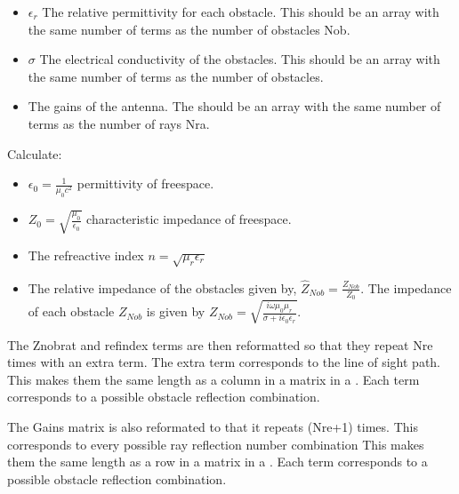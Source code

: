 \documentclass[letterpaper,10pt,english]{sphinxmanual}
\begin{document}
\begin{fulllineitems}
\begin{itemize}
\item {} 
     \sphinxhyphen{} \(\epsilon_r\) The relative permittivity for each obstacle.   This should be an array with the same number of terms as the number   of obstacles Nob.

\item {} 
     \sphinxhyphen{} \(\sigma\) The electrical conductivity of the obstacles.   This should be an array with the same number of terms as the number   of obstacles.

\item {} 
        \sphinxhyphen{} The gains of the antenna. The should be an array with   the same number of terms as the number of rays Nra.

\end{itemize}

Calculate:
\begin{itemize}
\item {} 
   \sphinxhyphen{} \(\epsilon_0=\frac{1}{\mu_0 c^2}\)  permittivity of   freespace.

\item {} 
     \sphinxhyphen{} \(Z_0=\sqrt{\frac{\mu_0}{\epsilon_0}}\) characteristic   impedance of freespace.

\item {} 
 \sphinxhyphen{} The refreactive index   \(n=\sqrt{\mu_r\epsilon_r}\)

\item {} 
\sphinxhyphen{} The relative impedance of the obstacles given by,
\(\hat{Z}_{Nob}=\frac{Z_{Nob}}{Z_0}\). The impedance of each     obstacle \(Z_{Nob}\) is given by     \(Z_{Nob}=\sqrt{\frac{i\omega\mu_0\mu_r}{\sigma+i\epsilon_0\epsilon_r}}\).

\end{itemize}

The Znobrat and refindex terms are then reformatted so that they   repeat Nre times with an extra term. The extra term corresponds to   the line of sight path. This makes them the same length as a column   in a matrix in a {\hyperref[\detokenize{index:DictionarySparseMatrix.DS}]{}}.   Each term corresponds to a possible obstacle reflection combination.

The Gains matrix is also reformated to that it repeats (Nre+1) times.   This corresponds to every possible ray reflection number combination   This makes them the same length as a row in a matrix in a   {\hyperref[\detokenize{index:DictionarySparseMatrix.DS}]{}}.   Each term corresponds to a possible obstacle reflection combination.


\end{fulllineitems}
\end{document}
